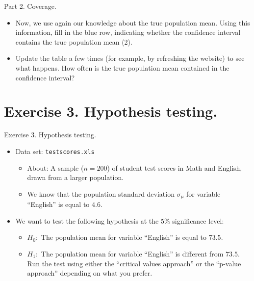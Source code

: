 \documentclass[
  10pt,
  ignorenonframetext,
]{beamer}
\providecommand{\tightlist}{%
  \setlength{\itemsep}{0pt}\setlength{\parskip}{0pt}}
\begin{document}
\begin{frame}{Part 2. Coverage.}
\protect\hypertarget{part-2.-coverage.}{}
\begin{itemize}
\item
  Now, we use again our knowledge about the true population mean. Using
  this information, fill in the blue row, indicating whether the
  confidence interval contains the true population mean (2).
\item
  Update the table a few times (for example, by refreshing the website)
  to see what happens. How often is the true population mean contained
  in the confidence interval?
\end{itemize}
\end{frame}

\hypertarget{exercise-3.-hypothesis-testing.}{%
\section{Exercise 3. Hypothesis
testing.}\label{exercise-3.-hypothesis-testing.}}

\begin{frame}{Exercise 3. Hypothesis testing.}
\begin{itemize}
\tightlist
\item
  Data set: \texttt{testscores.xls}

  \begin{itemize}
  \tightlist
  \item
    About: A sample (\(n=200\)) of student test scores in Math and
    English, drawn from a larger population.
  \item
    We know that the population standard deviation \(\sigma_\mu\) for
    variable ``English'' is equal to \(4.6\).
  \end{itemize}
\end{itemize}

\vspace{3mm}

\begin{itemize}
\tightlist
\item
  We want to test the following hypothesis at the \(5\%\) significance
  level:

  \begin{itemize}
  \tightlist
  \item
    \(H_0:\) The population mean for variable ``English'' is equal to
    \(73.5\).
  \item
    \(H_1:\) The population mean for variable ``English'' is different
    from \(73.5\). Run the test using either the ``critical values
    approach'' or the ``p-value approach'' depending on what you prefer.
  \end{itemize}
\end{itemize}
\end{frame}
\end{document}
